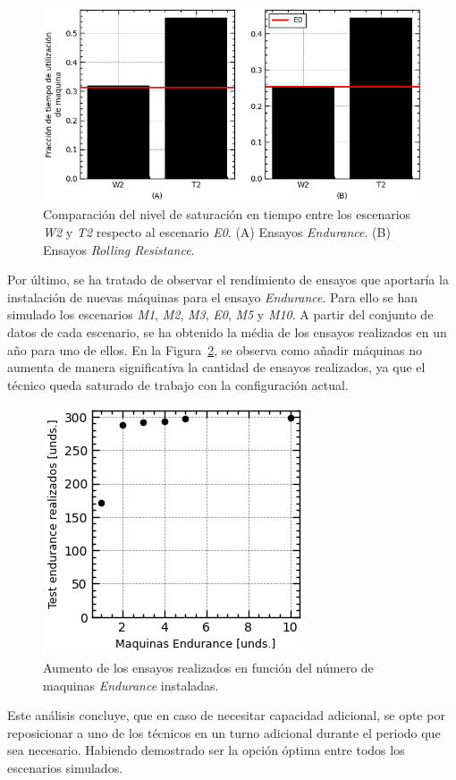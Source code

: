 \begin{figure}
	\begin{center}
		\includegraphics[width=\textwidth]{fig/4_bar_2shift-2techn_comp}
	\end{center}
	\caption{Comparación del nivel de saturación en tiempo entre los
		escenarios \textit{W2} y \textit{T2} respecto al escenario \textit{E0}.
	(A) Ensayos \textit{Endurance}. (B) Ensayos \textit{Rolling Resistance}.}
	\label{fig:4_bar_2shift-2techn_comp}
\end{figure}

Por último, se ha tratado de observar el rendimiento de ensayos
que aportaría la instalación de nuevas máquinas
para el ensayo \textit{Endurance}.
Para ello se han simulado los escenarios \textit{M1}, \textit{M2}, \textit{M3},
\textit{E0}, \textit{M5} y \textit{M10}.
A partir del conjunto de datos de cada escenario,
se ha obtenido la média de los ensayos realizados en un año para uno de ellos.
En la Figura~\ref{fig:4_sctr_indoor}, se observa como añadir máquinas
no aumenta de manera significativa la cantidad de ensayos realizados,
ya que el técnico queda saturado de trabajo con la configuración actual.

\begin{figure}[H]
	\begin{center}
	\includegraphics{fig/4_sctr_indoor}
	\end{center}
	\caption{Aumento de los ensayos realizados en función del
	número de maquinas \textit{Endurance} instaladas.}
	\label{fig:4_sctr_indoor}
\end{figure}

Este análisis concluye, que en caso de necesitar capacidad adicional,
se opte por reposicionar a uno de los técnicos
en un turno adicional durante el periodo que sea necesario.
Habiendo demostrado ser la opción óptima entre todos los escenarios simulados.
